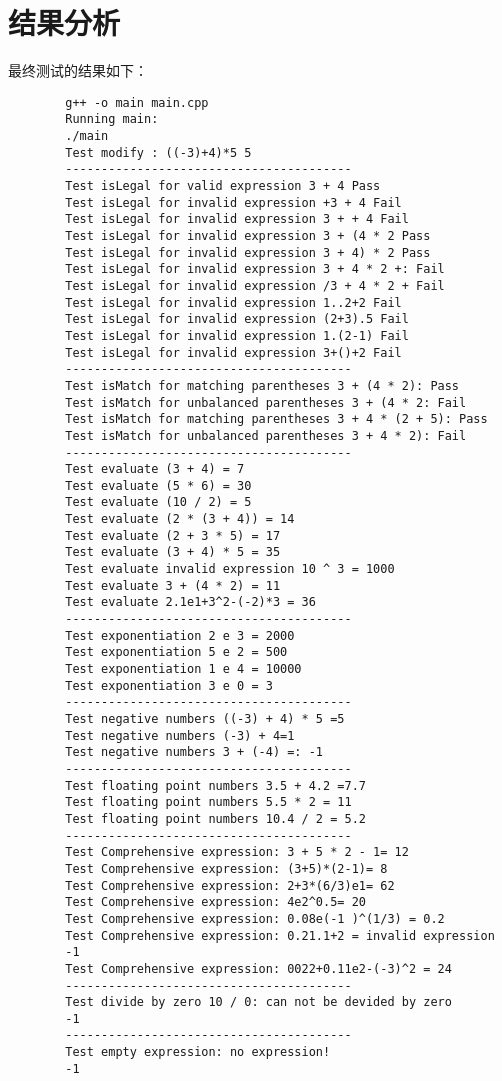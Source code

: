 \documentclass[UTF8]{ctexart}
\begin{document}
	\section{结果分析}
	最终测试的结果如下：
	\begin{lstlisting}
		g++ -o main main.cpp
		Running main:
		./main
		Test modify : ((-3)+4)*5 5
		----------------------------------------
		Test isLegal for valid expression 3 + 4 Pass
		Test isLegal for invalid expression +3 + 4 Fail
		Test isLegal for invalid expression 3 + + 4 Fail
		Test isLegal for invalid expression 3 + (4 * 2 Pass
		Test isLegal for invalid expression 3 + 4) * 2 Pass
		Test isLegal for invalid expression 3 + 4 * 2 +: Fail
		Test isLegal for invalid expression /3 + 4 * 2 + Fail
		Test isLegal for invalid expression 1..2+2 Fail
		Test isLegal for invalid expression (2+3).5 Fail
		Test isLegal for invalid expression 1.(2-1) Fail
		Test isLegal for invalid expression 3+()+2 Fail
		----------------------------------------
		Test isMatch for matching parentheses 3 + (4 * 2): Pass
		Test isMatch for unbalanced parentheses 3 + (4 * 2: Fail
		Test isMatch for matching parentheses 3 + 4 * (2 + 5): Pass
		Test isMatch for unbalanced parentheses 3 + 4 * 2): Fail
		----------------------------------------
		Test evaluate (3 + 4) = 7
		Test evaluate (5 * 6) = 30
		Test evaluate (10 / 2) = 5
		Test evaluate (2 * (3 + 4)) = 14
		Test evaluate (2 + 3 * 5) = 17
		Test evaluate (3 + 4) * 5 = 35
		Test evaluate invalid expression 10 ^ 3 = 1000
		Test evaluate 3 + (4 * 2) = 11
		Test evaluate 2.1e1+3^2-(-2)*3 = 36
		----------------------------------------
		Test exponentiation 2 e 3 = 2000
		Test exponentiation 5 e 2 = 500
		Test exponentiation 1 e 4 = 10000
		Test exponentiation 3 e 0 = 3
		----------------------------------------
		Test negative numbers ((-3) + 4) * 5 =5
		Test negative numbers (-3) + 4=1
		Test negative numbers 3 + (-4) =: -1
		----------------------------------------
		Test floating point numbers 3.5 + 4.2 =7.7
		Test floating point numbers 5.5 * 2 = 11
		Test floating point numbers 10.4 / 2 = 5.2
		----------------------------------------
		Test Comprehensive expression: 3 + 5 * 2 - 1= 12
		Test Comprehensive expression: (3+5)*(2-1)= 8
		Test Comprehensive expression: 2+3*(6/3)e1= 62
		Test Comprehensive expression: 4e2^0.5= 20
		Test Comprehensive expression: 0.08e(-1 )^(1/3) = 0.2
		Test Comprehensive expression: 0.21.1+2 = invalid expression
		-1
		Test Comprehensive expression: 0022+0.11e2-(-3)^2 = 24
		----------------------------------------
		Test divide by zero 10 / 0: can not be devided by zero
		-1
		----------------------------------------
		Test empty expression: no expression!
		-1
		
	\end{lstlisting}
\end{document}
